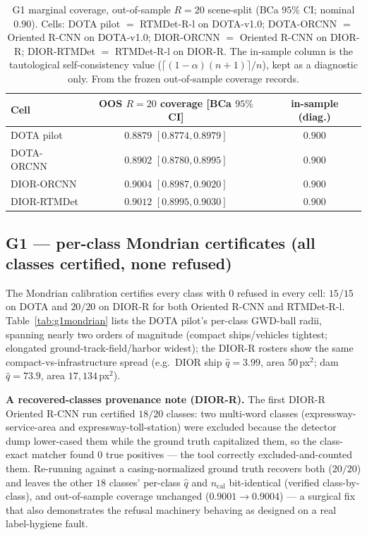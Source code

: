 \documentclass[journal]{IEEEtran}
\begin{document}
\begin{table}[!t]\centering\footnotesize
\setlength{\tabcolsep}{3pt}
\caption{G1 marginal coverage, out-of-sample $R{=}20$ scene-split (BCa $95\%$ CI; nominal $0.90$).
Cells: DOTA pilot $=$ RTMDet-R-l on DOTA-v1.0; DOTA-ORCNN $=$ Oriented R-CNN on DOTA-v1.0;
DIOR-ORCNN $=$ Oriented R-CNN on DIOR-R; DIOR-RTMDet $=$ RTMDet-R-l on DIOR-R. The in-sample
column is the tautological self-consistency value ($\lceil(1-\alpha)(n+1)\rceil/n$), kept as a
diagnostic only. From the frozen out-of-sample coverage records.}\label{tab:g1oos}
\begin{tabular}{lcc}
\toprule
Cell & OOS $R{=}20$ coverage [BCa $95\%$ CI] & in-sample (diag.) \\
\midrule
DOTA pilot   & $0.8879$ $[0.8774,0.8979]$ & $0.900$ \\
DOTA-ORCNN   & $0.8902$ $[0.8780,0.8995]$ & $0.900$ \\
DIOR-ORCNN   & $0.9004$ $[0.8987,0.9020]$ & $0.900$ \\
DIOR-RTMDet  & $0.9012$ $[0.8995,0.9030]$ & $0.900$ \\
\bottomrule
\end{tabular}
\end{table}

\subsection{G1 --- per-class Mondrian certificates (all classes certified, none refused)}
The Mondrian calibration certifies every class with $0$ refused in every cell: $15/15$ on DOTA and
$20/20$ on DIOR-R for both Oriented R-CNN and RTMDet-R-l. Table~\ref{tab:g1mondrian} lists the DOTA pilot's
per-class GWD-ball radii, spanning nearly two orders of magnitude (compact ships/vehicles tightest;
elongated ground-track-field/harbor widest); the DIOR-R rosters show the same compact-vs-infrastructure spread
(e.g.\ DIOR ship $\hat q{=}3.99$, area $50$\,px$^2$; dam $\hat q{=}73.9$, area $17{,}134$\,px$^2$).

\textbf{A recovered-classes provenance note (DIOR-R).} The first DIOR-R Oriented R-CNN run certified $18/20$
classes: two multi-word classes (expressway-service-area and expressway-toll-station) were
excluded because the detector dump lower-cased them while the ground truth capitalized them, so the
class-exact matcher found $0$ true positives --- the tool correctly excluded-and-counted them. Re-running
against a casing-normalized ground truth recovers both ($20/20$) and leaves the other $18$ classes'
per-class $\hat q$ and $n_{\mathrm{cal}}$ bit-identical (verified class-by-class), and out-of-sample
coverage unchanged ($0.9001\!\to\!0.9004$) --- a surgical fix that also demonstrates the refusal machinery
behaving as designed on a real label-hygiene fault.
\end{document}
